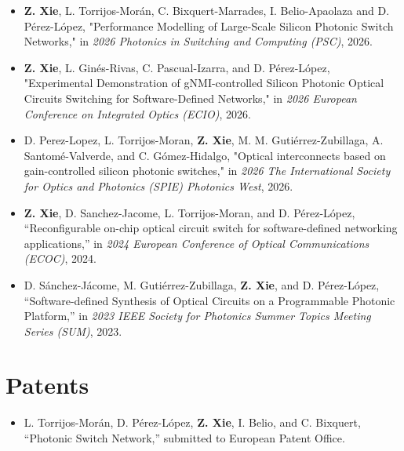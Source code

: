 \begin{itemize}
  \item \textbf{Z. Xie}, L. Torrijos-Morán, C. Bixquert-Marrades, I. Belio-Apaolaza and D. Pérez-López, "Performance Modelling of Large-Scale Silicon Photonic Switch Networks," in \textit{2026  Photonics in Switching and Computing (PSC)}, 2026.
  \item \textbf{Z. Xie}, L. Ginés-Rivas, C. Pascual-Izarra, and D. Pérez-López, "Experimental Demonstration of gNMI-controlled Silicon Photonic Optical Circuits Switching for Software-Defined Networks," in \textit{2026  European Conference on Integrated Optics (ECIO)}, 2026.
  \item D. Perez-Lopez, L. Torrijos-Moran, \textbf{Z. Xie}, M. M. Gutiérrez-Zubillaga, A. Santomé-Valverde, and C. Gómez-Hidalgo, "Optical interconnects based on gain-controlled silicon photonic switches," in \textit{2026 The International Society for Optics and Photonics (SPIE) Photonics West}, 2026.
  \item \textbf{Z. Xie}, D. Sanchez-Jacome, L. Torrijos-Moran, and D. Pérez-López, “Reconfigurable on-chip optical circuit switch for software-defined networking applications,” in \textit{2024 European Conference of Optical Communications (ECOC)}, 2024.
  \item D. Sánchez-Jácome, M. Gutiérrez-Zubillaga, \textbf{Z. Xie}, and D. Pérez-López, “Software-defined Synthesis of Optical Circuits on a Programmable Photonic Platform,” in \textit{2023 IEEE Society for Photonics Summer Topics Meeting Series (SUM)}, 2023.
\end{itemize}

\section*{Patents}

\begin{itemize}
  \item L. Torrijos-Morán, D. Pérez-López, \textbf{Z. Xie}, I. Belio, and C. Bixquert, “Photonic Switch Network,” submitted to European Patent Office.
\end{itemize}
